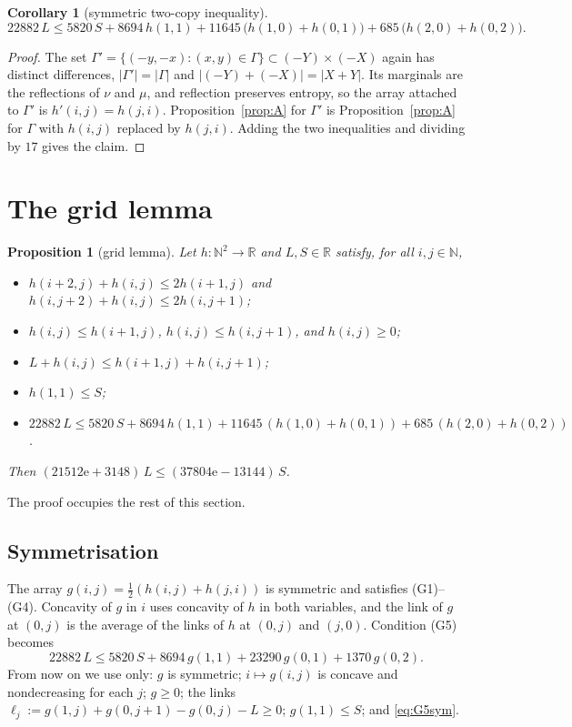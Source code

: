 \documentclass[11pt]{amsart}
\newtheorem{proposition}[theorem]{Proposition}
\newtheorem{corollary}[theorem]{Corollary}
\theoremstyle{definition}
\theoremstyle{remark}
\numberwithin{equation}{section}
\newcommand{\N}{\mathbb{N}}
\newcommand{\R}{\mathbb{R}}
\newcommand{\e}{\mathrm{e}}
\begin{document}
\begin{corollary}[symmetric two-copy inequality]\label{cor:Asym}
\[
  22882\,L\le 5820\,S+8694\,h(1,1)+11645\,\bigl(h(1,0)+h(0,1)\bigr)+685\,\bigl(h(2,0)+h(0,2)\bigr).
\]
\end{corollary}

\begin{proof}
The set $\Gamma'=\{(-y,-x):(x,y)\in\Gamma\}\subset(-Y)\times(-X)$ again has distinct differences,
$|\Gamma'|=|\Gamma|$ and $|(-Y)+(-X)|=|X+Y|$. Its marginals are the reflections of $\nu$ and $\mu$,
and reflection preserves entropy, so the array attached to $\Gamma'$ is $h'(i,j)=h(j,i)$.
Proposition~\ref{prop:A} for $\Gamma'$ is Proposition~\ref{prop:A} for $\Gamma$ with
$h(i,j)$ replaced by $h(j,i)$. Adding the two inequalities and dividing by $17$ gives the claim.
\end{proof}

\section{The grid lemma}\label{sec:grid}

\begin{proposition}[grid lemma]\label{prop:grid}
Let $h:\N^2\to\R$ and $L,S\in\R$ satisfy, for all $i,j\in\N$,
\begin{itemize}
\item[(G1)] $h(i+2,j)+h(i,j)\le2h(i+1,j)$ and $h(i,j+2)+h(i,j)\le2h(i,j+1)$;
\item[(G2)] $h(i,j)\le h(i+1,j)$, $h(i,j)\le h(i,j+1)$, and $h(i,j)\ge0$;
\item[(G3)] $L+h(i,j)\le h(i+1,j)+h(i,j+1)$;
\item[(G4)] $h(1,1)\le S$;
\item[(G5)] $22882\,L\le 5820\,S+8694\,h(1,1)+11645\,(h(1,0)+h(0,1))+685\,(h(2,0)+h(0,2))$.
\end{itemize}
Then $(21512\e+3148)\,L\le(37804\e-13144)\,S$.
\end{proposition}

The proof occupies the rest of this section.

\subsection{Symmetrisation}
The array $g(i,j)=\frac12(h(i,j)+h(j,i))$ is symmetric and satisfies (G1)--(G4). Concavity of $g$
in $i$ uses concavity of $h$ in both variables, and the link of $g$ at $(0,j)$ is the average of
the links of $h$ at $(0,j)$ and $(j,0)$. Condition (G5) becomes
\begin{equation}\label{eq:G5sym}
  22882\,L\le5820\,S+8694\,g(1,1)+23290\,g(0,1)+1370\,g(0,2).
\end{equation}
From now on we use only: $g$ is symmetric; $i\mapsto g(i,j)$ is concave and nondecreasing for each
$j$; $g\ge0$; the links $\ell_j:=g(1,j)+g(0,j+1)-g(0,j)-L\ge0$; $g(1,1)\le S$; and
\eqref{eq:G5sym}.
\end{document}
